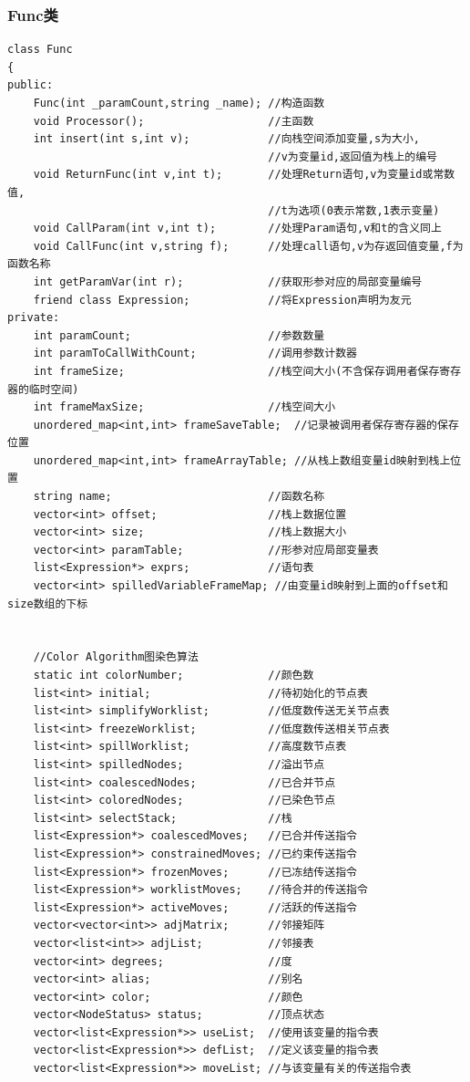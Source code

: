 \documentclass[UTF8]{article}
\begin{document}
\subsubsection{Func类}
\begin{lstlisting}
class Func
{
public:
    Func(int _paramCount,string _name); //构造函数
    void Processor();                   //主函数
    int insert(int s,int v);            //向栈空间添加变量,s为大小,
                                        //v为变量id,返回值为栈上的编号
    void ReturnFunc(int v,int t);       //处理Return语句,v为变量id或常数值,
                                        //t为选项(0表示常数,1表示变量)
    void CallParam(int v,int t);        //处理Param语句,v和t的含义同上
    void CallFunc(int v,string f);      //处理call语句,v为存返回值变量,f为函数名称
    int getParamVar(int r);             //获取形参对应的局部变量编号
    friend class Expression;            //将Expression声明为友元
private:
    int paramCount;                     //参数数量
    int paramToCallWithCount;           //调用参数计数器
    int frameSize;                      //栈空间大小(不含保存调用者保存寄存器的临时空间)
    int frameMaxSize;                   //栈空间大小
    unordered_map<int,int> frameSaveTable;  //记录被调用者保存寄存器的保存位置
    unordered_map<int,int> frameArrayTable; //从栈上数组变量id映射到栈上位置
    string name;                        //函数名称
    vector<int> offset;                 //栈上数据位置
    vector<int> size;                   //栈上数据大小
    vector<int> paramTable;             //形参对应局部变量表
    list<Expression*> exprs;            //语句表
    vector<int> spilledVariableFrameMap; //由变量id映射到上面的offset和size数组的下标


    //Color Algorithm图染色算法
    static int colorNumber;             //颜色数
    list<int> initial;                  //待初始化的节点表
    list<int> simplifyWorklist;         //低度数传送无关节点表
    list<int> freezeWorklist;           //低度数传送相关节点表
    list<int> spillWorklist;            //高度数节点表
    list<int> spilledNodes;             //溢出节点
    list<int> coalescedNodes;           //已合并节点
    list<int> coloredNodes;             //已染色节点
    list<int> selectStack;              //栈
    list<Expression*> coalescedMoves;   //已合并传送指令
    list<Expression*> constrainedMoves; //已约束传送指令
    list<Expression*> frozenMoves;      //已冻结传送指令
    list<Expression*> worklistMoves;    //待合并的传送指令
    list<Expression*> activeMoves;      //活跃的传送指令
    vector<vector<int>> adjMatrix;      //邻接矩阵
    vector<list<int>> adjList;          //邻接表
    vector<int> degrees;                //度
    vector<int> alias;                  //别名
    vector<int> color;                  //颜色
    vector<NodeStatus> status;          //顶点状态
    vector<list<Expression*>> useList;  //使用该变量的指令表
    vector<list<Expression*>> defList;  //定义该变量的指令表
    vector<list<Expression*>> moveList; //与该变量有关的传送指令表



\end{lstlisting}
\end{document}
